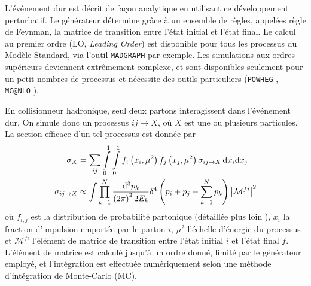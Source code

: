 L'événement dur est décrit de façon analytique en utilisant ce développement perturbatif. Le générateur détermine grâce à un ensemble de règles, appelées règle de Feynman, la matrice de transition entre l'état initial et l'état final. Le calcul au premier ordre (LO, \emph{Leading Order}) est disponible pour tous les processus du Modèle Standard, via l'outil \texttt{MADGRAPH} \citep{madgraph} par exemple. Les simulations aux ordres supérieurs deviennent extrêmement complexe, et sont disponibles seulement pour un petit nombres de processus et nécessite des outils particuliers (\texttt{POWHEG} \citep{Alioli:2010xd}, \texttt{MC@NLO} \citep{1126-6708-2002-06-029}).

En collisionneur hadronique, seul deux partons interagissent dans l'événement dur. On simule donc un processus $ij \rightarrow X$, où $X$ est une ou plusieurs particules. La section efficace d'un tel processus est donnée par
\begin{align}
  \sigma_{X} &= \sum_{ij} \int \displaylimits_0^1 \int \displaylimits_0^1 f_i\left( x_i, \mu^2 \right) f_j\left(x_j, \mu^2\right) \sigma_{ij \rightarrow X}\, \mathrm{d}x_i \mathrm{d}x_j \\
  \sigma_{ij \rightarrow X} &\propto \int \prod \displaylimits_{k = 1}^{N} \frac{\mathrm{d}^3p_k}{\left( 2 \pi \right)^2 2 E_k} \delta^4\left( p_i + p_j - \sum_{k = 1}^{N} p_k \right) \left| \mathcal{M}^{fi} \right|^2
\end{align}
où $f_{i, j}$ est la distribution de probabilité partonique (détaillée plus loin ), $x_i$ la fraction d'impulsion emportée par le parton $i$, $\mu^2$ l'échelle d'énergie du processus et $\mathcal{M}^{fi}$ l'élément de matrice de transition entre l'état initial $i$ et l'état final $f$. L'élément de matrice est calculé jusqu'à un ordre donné, limité par le générateur employé, et l'intégration est effectuée numériquement selon une méthode d'intégration de Monte-Carlo (MC).

